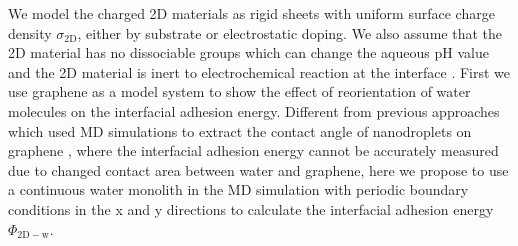 \documentclass[aps,prl,reprint,groupedaddress,amsmath,amssymb, showpacs]{revtex4-1}
\begin{document}
We model the charged 2D materials as rigid sheets with uniform surface
charge density \(\sigma_{\mathrm{2D}}\), either by substrate or
electrostatic doping. We also assume that the 2D material has no
dissociable groups which can change the aqueous pH value
\cite{zuccaro_tuning_2015} and the 2D material is inert to
electrochemical reaction at the interface
\cite{bard_electrochemical_1980}.  First we use graphene as a model
system to show the effect of reorientation of water molecules on the
interfacial adhesion energy. Different from previous approaches which
used MD simulations to extract the contact angle of nanodroplets on
graphene
\cite{ostrowski_tunable_2014,daub_electrowetting_2007,ren_interfacial_2015,Taherian_2015},
where the interfacial adhesion energy cannot be accurately measured
due to changed contact area between water and graphene, here we
propose to use a continuous water monolith in the MD simulation with periodic boundary conditions in the x and y directions to
calculate the interfacial adhesion energy \(\Phi_{\mathrm{2D-w}}\).
\begin{center}
\end{center}
\end{document}
